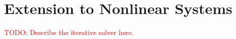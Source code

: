 \documentclass[11pt]{article}
\newcommand{\T}{\intercal}
\newcommand\dd[2]{\frac{\partial#1}{\partial#2}}
\newcommand\todo[1]{\textcolor{red}{TODO: #1}}
\begin{document}





\section{Extension to Nonlinear Systems}
\todo{Describe the iterative solver here.}

\newpage
\end{document}
